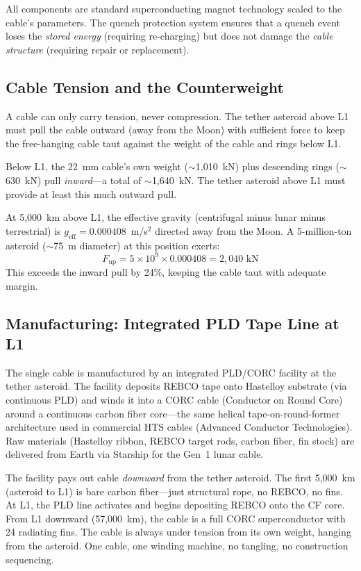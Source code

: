 \documentclass[12pt,letterpaper]{article}
\begin{document}
All components are standard superconducting magnet technology scaled to the cable's parameters. The quench protection system ensures that a quench event loses the \emph{stored energy} (requiring re-charging) but does not damage the \emph{cable structure} (requiring repair or replacement).

\subsection{Cable Tension and the Counterweight}

A cable can only carry tension, never compression. The tether asteroid above L1 must pull the cable outward (away from the Moon) with sufficient force to keep the free-hanging cable taut against the weight of the cable and rings below L1.

Below L1, the 22~mm cable's own weight (${\sim}$1{,}010~kN) plus descending rings (${\sim}$630~kN) pull \emph{inward}---a total of ${\sim}$1{,}640~kN. The tether asteroid above L1 must provide at least this much outward pull.

At 5,000~km above L1, the effective gravity (centrifugal minus lunar minus terrestrial) is $g_{\text{eff}} = 0.000408$~m/s$^2$ directed away from the Moon. A 5-million-ton asteroid (${\sim}$75~m diameter) at this position exerts:
\begin{equation}
F_{\text{up}} = 5 \times 10^9 \times 0.000408 = 2{,}040 \text{~kN}
\end{equation}
This exceeds the inward pull by 24\%, keeping the cable taut with adequate margin.

\subsection{Manufacturing: Integrated PLD Tape Line at L1}\label{sec:manufacturing}

The single cable is manufactured by an integrated PLD/CORC facility at the tether asteroid. The facility deposits REBCO tape onto Hastelloy substrate (via continuous PLD) and winds it into a CORC cable (Conductor on Round Core) around a continuous carbon fiber core---the same helical tape-on-round-former architecture used in commercial HTS cables (Advanced Conductor Technologies). Raw materials (Hastelloy ribbon, REBCO target rods, carbon fiber, fin stock) are delivered from Earth via Starship for the Gen~1 lunar cable.

The facility pays out cable \emph{downward} from the tether asteroid. The first 5{,}000~km (asteroid to L1) is bare carbon fiber---just structural rope, no REBCO, no fins. At L1, the PLD line activates and begins depositing REBCO onto the CF core. From L1 downward (57{,}000~km), the cable is a full CORC superconductor with 24 radiating fins. The cable is always under tension from its own weight, hanging from the asteroid. One cable, one winding machine, no tangling, no construction sequencing.
\end{document}
